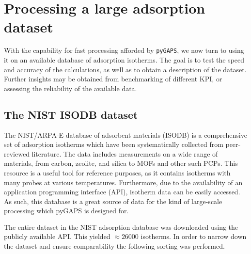 
\section{Processing a large adsorption dataset}

With the capability for fast processing
afforded by \texttt{pyGAPS}, we now turn to using it on an
available database of adsorption isotherms. The goal is to
test the speed and accuracy of the calculations, as well
as to obtain a description of the dataset. Further insights
may be obtained from benchmarking of different \gls{KPI}, or
assessing the reliability of the available data.

\subsection{The NIST ISODB dataset}

The NIST/ARPA-E database of adsorbent materials (ISODB) is a comprehensive
set of adsorption isotherms which have been systematically
collected from peer-reviewed literature. The data includes
measurements on a wide range of materials, from carbon, zeolite,
and silica to MOFs and other such PCPs. This resource is a useful
tool for reference purposes, as it contains isotherms with many probes
at various temperatures. Furthermore, due to the availability of an
application programming interface (API), isotherm data can be easily
accessed. As such, this database is a great
source of data for the kind of large-scale processing which pyGAPS
is designed for.

The entire dataset in the NIST adsorption database was downloaded using the
publicly available API. This yielded \(\approx \! 26000\) isotherms.
In order to narrow down the dataset and ensure comparability
the following sorting was performed.

